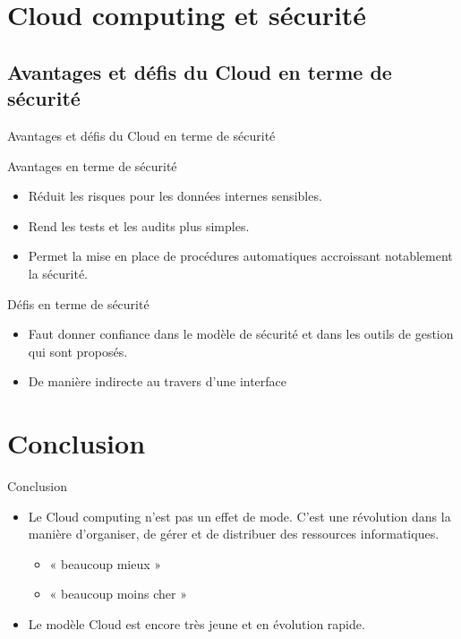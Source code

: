\documentclass{beamer}
\begin{document}
\section{Cloud computing et sécurité}

\subsection{Avantages et défis du Cloud en terme de sécurité}
\begin{frame}{Avantages et défis du Cloud en terme de sécurité}
\begin{block}{Avantages en terme de sécurité}
  \begin{itemize}
  \item Réduit les risques pour les données internes sensibles.
  \item Rend les tests et les audits plus simples. 
  \item Permet la mise en place  de procédures automatiques accroissant notablement la sécurité.
  \end{itemize}
\end{block}
\pause
\begin{block}{Défis en terme de sécurité}
  \begin{itemize}
  \item Faut donner confiance dans le modèle de sécurité et dans les outils de gestion qui sont proposés.
  \item De manière indirecte au travers d’une interface
  \end{itemize}
\end{block}
\end{frame}


\section*{Conclusion}

\begin{frame}{Conclusion}
  \begin{itemize}
  \item
    Le Cloud computing n’est pas un effet de mode. C’est une \alert{révolution} dans la manière d’organiser, de gérer et de distribuer des ressources informatiques.
  \begin{itemize}
  \item
    « beaucoup mieux » 
  \item
    « beaucoup moins cher »
  \end{itemize}
  \end{itemize}
  
  \begin{itemize}
  \item
     Le modèle Cloud est encore très jeune et en évolution rapide.

  \end{itemize}
\end{frame}
\end{document}
